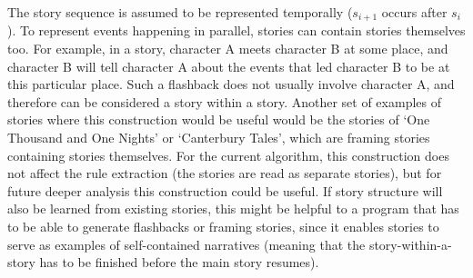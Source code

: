 The story sequence is assumed to be represented temporally ($s_{i+1}$ occurs
after $s_i$). To represent events happening in parallel, stories can contain
stories themselves too. For example, in a story, character A meets
character B at some place, and character B will tell character A about the
events that led character B to be at this particular place. Such a flashback
does not usually involve character A, and therefore can be considered a story within a
story. Another set of examples of stories where this construction would be
useful would be the stories of `One Thousand and One Nights' or `Canterbury Tales',
which are framing stories containing stories themselves. For the current algorithm, this construction does not
affect the rule extraction (the stories are read as separate stories), 
but for future deeper analysis this construction could be useful. If story
structure will also be learned from existing stories, this might be helpful to a
program that has to be able to generate flashbacks or framing stories, since it
enables stories to serve as examples of self-contained narratives (meaning that
the story-within-a-story has to be finished before the main story resumes).

